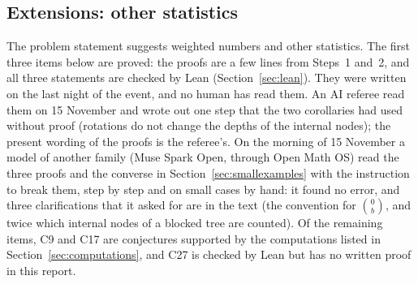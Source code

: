 \documentclass[11pt]{article}
\theoremstyle{definition}
\theoremstyle{remark}
\numberwithin{equation}{section}
\numberwithin{figure}{section}
\begin{document}
\subsection{Extensions: other statistics}\label{sec:extensions}
The problem statement suggests weighted numbers and other statistics. The first three items below are proved:
the proofs are a few lines from Steps~1 and~2, and all three statements are checked by Lean
(Section~\ref{sec:lean}). They were written on the last night of the event, and no human has read them. An AI
referee read them on 15 November and wrote out one step that the two corollaries had used without proof
(rotations do not change the depths of the internal nodes); the present wording of the proofs is the
referee's. On the morning of 15 November a model of another family (Muse Spark Open, through Open Math OS) read
the three proofs and the converse in Section~\ref{sec:smallexamples} with the instruction to break them, step
by step and on small cases by hand: it found no error, and three clarifications that it asked for are in the
text (the convention for $\binom{0}{b}$, and twice which internal nodes of a blocked tree are counted). Of the
remaining items, C9 and C17 are conjectures supported by the computations listed in
Section~\ref{sec:computations}, and C27 is checked by Lean but has no written proof in this report.
\end{document}

